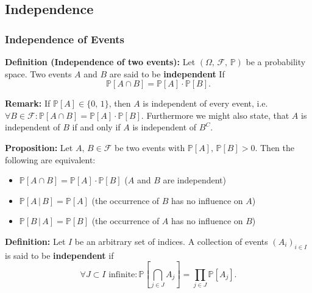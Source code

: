 \documentclass[a4paper]{extarticle}
\begin{document}
\subsection{Independence}

\subsubsection{Independence of Events}

\textbf{Definition (Independence of two events):} Let \((\Omega, \, \mathcal{F}, \, \mathbb{P})\) be a probability space. Two events \(A\) and \(B\) are said to be \textbf{independent} If
\[
    \mathbb{P}[A \cap B] = \mathbb{P}[A] \cdot \mathbb{P}[B].
\]

\textbf{Remark:} If \(\mathbb{P}[A] \in \{0, \, 1\}\), then \(A\) is independent of every event, i.e. \(\forall B \in \mathcal{F} : \mathbb{P}[A \cap B] = \mathbb{P}[A] \cdot \mathbb{P}[B]\). Furthermore we might also state, that \(A\) is independent of \(B\) if and only if \(A\) is independent of \(B^C\).

\textbf{Proposition:} Let \(A, \, B \in \mathcal{F}\) be two events with \(\mathbb{P}[A], \, \mathbb{P}[B] > 0\). Then the following are equivalent:

\begin{itemize}
    \item \(\mathbb{P}[A \cap B] = \mathbb{P}[A] \cdot \mathbb{P}[B]\) (\(A\) and \(B\) are independent)
    \item \(\mathbb{P}[A \, | \, B] = \mathbb{P}[A]\) (the occurrence of \(B\) has no influence on \(A\))
    \item \(\mathbb{P}[B \, | \, A] = \mathbb{P}[B]\) (the occurrence of \(A\) has no influence on \(B\))
\end{itemize}

\textbf{Definition:} Let \(I\) be an arbitrary set of indices. A collection of events \((A_i)_{i \in I}\) is said to be \textbf{independent} if
\[
    \forall J \subset I \text{ infinite} : \mathbb{P}[\bigcap_{j \in J} A_j] = \prod_{j \in J} \mathbb{P}[A_j].
\]
\end{document}
